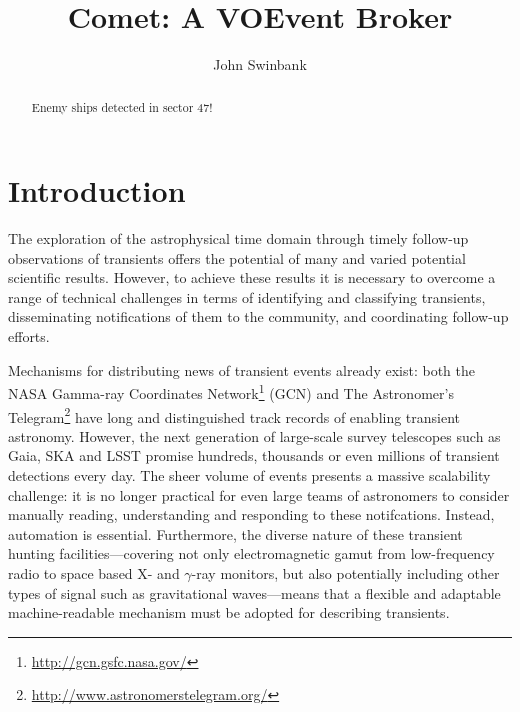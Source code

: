 \documentclass[5p,authoryear]{elsarticle}
\begin{document}
\begin{frontmatter}

\title{Comet: A VOEvent Broker}

\author{John Swinbank}

\address{Astronomical Institute ``Anton Pannekoek'', University of Amsterdam, Postbus 94249, 1090 GE Amsterdam, The Netherlands}

\begin{abstract}

Enemy ships detected in sector 47!

\end{abstract}

\begin{keyword}


\end{keyword}

\end{frontmatter}

\section{Introduction}
\label{sec:intro}

The exploration of the astrophysical time domain through timely follow-up
observations of transients offers the potential of many and varied potential
scientific results. However, to achieve these results it is necessary to
overcome a range of technical challenges in terms of identifying and
classifying transients, disseminating notifications of them to the community,
and coordinating follow-up efforts.

Mechanisms for distributing news of transient events already exist: both the
NASA Gamma-ray Coordinates Network\footnote{\url{http://gcn.gsfc.nasa.gov/}}
(GCN) and The Astronomer's
Telegram\footnote{\url{http://www.astronomerstelegram.org/}} have long and
distinguished track records of enabling transient astronomy. However, the next
generation of large-scale survey telescopes such as Gaia, SKA and LSST promise
hundreds, thousands or even millions of transient detections every day. The
sheer volume of events presents a massive scalability challenge: it is no
longer practical for even large teams of astronomers to consider manually
reading, understanding and responding to these notifcations. Instead,
automation is essential. Furthermore, the diverse nature of these transient
hunting facilities---covering not only electromagnetic gamut from
low-frequency radio to space based X- and $\gamma$-ray monitors, but also
potentially including other types of signal such as gravitational
waves---means that a flexible and adaptable machine-readable mechanism must be
adopted for describing transients.
\end{document}
